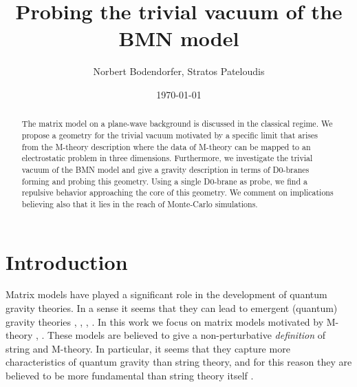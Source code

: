 \documentclass[11pt,english]{article}
\numberwithin{equation}{section}
\begin{document}
	\title{Probing the trivial vacuum of the BMN model}
	\author{Norbert Bodendorfer,  Stratos Pateloudis}  
	
	
	\date{\today}
	
	\maketitle
	
\begin{abstract}
 The matrix model on a plane-wave background is discussed in the classical regime.  We propose a geometry for the trivial vacuum motivated by a specific limit that arises from the M-theory description where the data of M-theory can be mapped to an electrostatic problem in three dimensions. Furthermore, we investigate the trivial vacuum of the BMN model and give a gravity description in terms of D0-branes forming and probing this geometry. Using a single D0-brane as  probe, we find a repulsive behavior approaching the core of this geometry. We comment on implications believing also that it lies in the reach of Monte-Carlo simulations.    
\end{abstract}

\newpage

\section{Introduction}

Matrix models have played a significant role in the development of quantum gravity theories. In a sense it seems that they can lead to emergent (quantum) gravity theories \cite{Hooft1974},  \cite{DiFrancesco},  \cite{DijkgraafMatrixStringTheory}, \cite{Klebanov1991}. In this work we focus on matrix models motivated by M-theory \cite{Banks1997}, \cite{Berenstein2002}. These models are believed to give a non-perturbative \textit{definition} of string and M-theory. In particular, it seems that they capture more characteristics of quantum gravity than string theory, and for this reason they are believed to be more fundamental than string theory itself \cite{Taylor2001}. 
\end{document}
